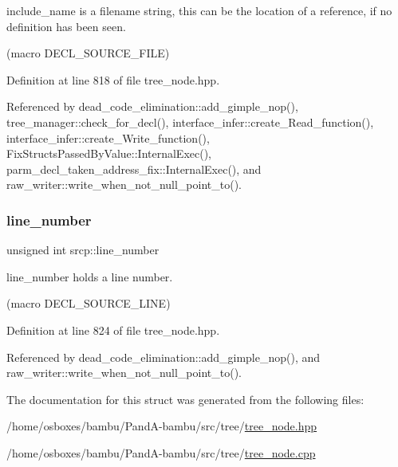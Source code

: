 include\+\_\+name is a filename string, this can be the location of a reference, if no definition has been seen. 

(macro D\+E\+C\+L\+\_\+\+S\+O\+U\+R\+C\+E\+\_\+\+F\+I\+LE) 

Definition at line 818 of file tree\+\_\+node.\+hpp.



Referenced by dead\+\_\+code\+\_\+elimination\+::add\+\_\+gimple\+\_\+nop(), tree\+\_\+manager\+::check\+\_\+for\+\_\+decl(), interface\+\_\+infer\+::create\+\_\+\+Read\+\_\+function(), interface\+\_\+infer\+::create\+\_\+\+Write\+\_\+function(), Fix\+Structs\+Passed\+By\+Value\+::\+Internal\+Exec(), parm\+\_\+decl\+\_\+taken\+\_\+address\+\_\+fix\+::\+Internal\+Exec(), and raw\+\_\+writer\+::write\+\_\+when\+\_\+not\+\_\+null\+\_\+point\+\_\+to().

\mbox{\label{structsrcp_afcd6e053ca808ba23367bc53608f1771}} 
\subsubsection{\texorpdfstring{line\+\_\+number}{line\_number}}
{\footnotesize\ttfamily unsigned int srcp\+::line\+\_\+number}



line\+\_\+number holds a line number. 

(macro D\+E\+C\+L\+\_\+\+S\+O\+U\+R\+C\+E\+\_\+\+L\+I\+NE) 

Definition at line 824 of file tree\+\_\+node.\+hpp.



Referenced by dead\+\_\+code\+\_\+elimination\+::add\+\_\+gimple\+\_\+nop(), and raw\+\_\+writer\+::write\+\_\+when\+\_\+not\+\_\+null\+\_\+point\+\_\+to().



The documentation for this struct was generated from the following files\+:\begin{DoxyCompactItemize}
\item 
/home/osboxes/bambu/\+Pand\+A-\/bambu/src/tree/\hyperlink{tree__node_8hpp}{tree\+\_\+node.\+hpp}\item 
/home/osboxes/bambu/\+Pand\+A-\/bambu/src/tree/\hyperlink{tree__node_8cpp}{tree\+\_\+node.\+cpp}\end{DoxyCompactItemize}
